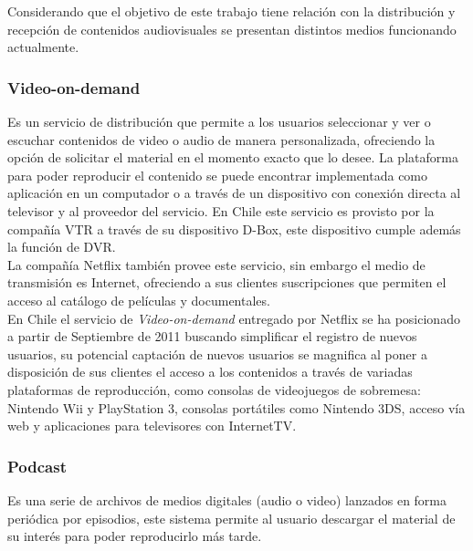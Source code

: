 Considerando que el objetivo de este trabajo tiene relación con la distribución y recepción de contenidos audiovisuales se presentan distintos medios funcionando actualmente.\\

\subsubsection{Video-on-demand}
Es un servicio de distribución que permite a los usuarios seleccionar y ver o escuchar contenidos de video o audio de manera personalizada, ofreciendo la opción de solicitar el material en el momento exacto que lo desee.  La plataforma para poder reproducir el contenido se puede encontrar implementada como aplicación en un computador o a través de un dispositivo con conexión directa al televisor y al proveedor del servicio. En Chile este servicio es provisto por la compañía VTR a través de su dispositivo D-Box, este dispositivo cumple además la función de DVR.\\

La compañía Netflix también provee este servicio, sin embargo el medio de transmisión es Internet, ofreciendo a sus clientes suscripciones que permiten el acceso al catálogo de películas y documentales.\\

En Chile el servicio de \textit{Video-on-demand} entregado por Netflix se ha posicionado a partir de Septiembre de 2011 buscando simplificar el registro de nuevos usuarios, su potencial captación de nuevos usuarios se magnifica al poner a disposición de sus clientes el acceso a los contenidos a través de variadas plataformas de reproducción, como consolas de videojuegos de sobremesa: Nintendo Wii y PlayStation 3, consolas portátiles como Nintendo 3DS, acceso vía web y aplicaciones para televisores con InternetTV. \\

\subsubsection{Podcast}
Es una serie de archivos de medios digitales (audio o video) lanzados en forma periódica por episodios, este sistema permite al usuario descargar el material de su interés para poder reproducirlo más tarde.\\

